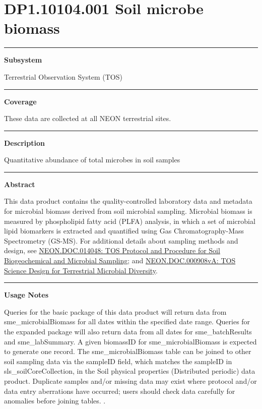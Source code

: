 \documentclass[]{article}
\begin{document}
\section{DP1.10104.001 Soil microbe
biomass}\label{dp1.10104.001-soil-microbe-biomass}

\begin{center}\rule{0.5\linewidth}{\linethickness}\end{center}

\textbf{Subsystem}

Terrestrial Observation System (TOS)

\begin{center}\rule{0.5\linewidth}{\linethickness}\end{center}

\textbf{Coverage}

These data are collected at all NEON terrestrial sites.

\begin{center}\rule{0.5\linewidth}{\linethickness}\end{center}

\textbf{Description}

Quantitative abundance of total microbes in soil samples

\begin{center}\rule{0.5\linewidth}{\linethickness}\end{center}

\textbf{Abstract}

This data product contains the quality-controlled laboratory data and
metadata for microbial biomass derived from soil microbial sampling.
Microbial biomass is measured by phospholipid fatty acid (PLFA)
analysis, in which a set of microbial lipid biomarkers is extracted and
quantified using Gas Chromatography-Mass Spectrometry (GS-MS). For
additional details about sampling methods and design, see
\href{http://data.neonscience.org/api/v0/documents/NEON.DOC.014048vJ}{NEON.DOC.014048:
TOS Protocol and Procedure for Soil Biogeochemical and Microbial
Sampling}; and
\href{http://data.neonscience.org/api/v0/documents/NEON.DOC.000908vA}{NEON.DOC.000908vA:
TOS Science Design for Terrestrial Microbial Diversity}.

\begin{center}\rule{0.5\linewidth}{\linethickness}\end{center}

\textbf{Usage Notes}

Queries for the basic package of this data product will return data from
sme\_microbialBiomass for all dates within the specified date range.
Queries for the expanded package will also return data from all dates
for sme\_batchResults and sme\_labSummary. A given biomassID for
sme\_microbialBiomass is expected to generate one record. The
sme\_microbialBiomass table can be joined to other soil sampling data
via the sampleID field, which matches the sampleID in
sls\_soilCoreCollection, in the Soil physical properties (Distributed
periodic) data product. Duplicate samples and/or missing data may exist
where protocol and/or data entry aberrations have occurred; users should
check data carefully for anomalies before joining tables. \newpage
.
\end{document}
